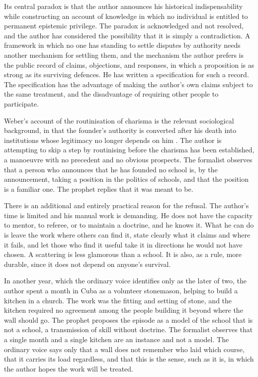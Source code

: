\documentclass[11pt,openany,twoside]{book}
\theoremstyle{plain}
\theoremstyle{definition}
\theoremstyle{remark}
\begin{document}
Its central paradox is that the author announces his historical indispensability while constructing an account of knowledge in which no individual is entitled to permanent epistemic privilege. The paradox is acknowledged and not resolved, and the author has considered the possibility that it is simply a contradiction. A framework in which no one has standing to settle disputes by authority needs another mechanism for settling them, and the mechanism the author prefers is the public record of claims, objections, and responses, in which a proposition is as strong as its surviving defences. He has written a specification for such a record. The specification has the advantage of making the author's own claims subject to the same treatment, and the disadvantage of requiring other people to participate.

Weber's account of the routinisation of charisma is the relevant sociological background, in that the founder's authority is converted after his death into institutions whose legitimacy no longer depends on him \cite{weber-economy}. The author is attempting to skip a step by routinising before the charisma has been established, a manoeuvre with no precedent and no obvious prospects. The formalist observes that a person who announces that he has founded no school is, by the announcement, taking a position in the politics of schools, and that the position is a familiar one. The prophet replies that it was meant to be.

There is an additional and entirely practical reason for the refusal. The author's time is limited and his manual work is demanding. He does not have the capacity to mentor, to referee, or to maintain a doctrine, and he knows it. What he can do is leave the work where others can find it, state clearly what it claims and where it fails, and let those who find it useful take it in directions he would not have chosen. A scattering is less glamorous than a school. It is also, as a rule, more durable, since it does not depend on anyone's survival.

In another year, which the ordinary voice identifies only as the later of two, the author spent a month in Cuba as a volunteer stonemason, helping to build a kitchen in a church. The work was the fitting and setting of stone, and the kitchen required no agreement among the people building it beyond where the wall should go. The prophet proposes the episode as a model of the school that is not a school, a transmission of skill without doctrine. The formalist observes that a single month and a single kitchen are an instance and not a model. The ordinary voice says only that a wall does not remember who laid which course, that it carries its load regardless, and that this is the sense, such as it is, in which the author hopes the work will be treated.
\end{document}
